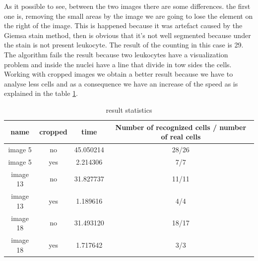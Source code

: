 As it possible to see, between the two images there are some differences. the first one is, removing the small areas by the image we are going to lose the element on the right of the image. This is happened because it was artefact caused by the Giemsa stain method, then is obvious that it's not well segmented because under the stain is not present  leukocyte. The result of the counting in this case is 29. The algorithm fails the result because two leukocytes have a visualization problem and inside the nuclei have a line that divide in tow sides the cells.
Working with cropped images we obtain a better result because we have to analyse less cells and as a consequence we have an increase of the speed as is explained in the table \ref{statistics}.
\begin{table}
\centering
\begin{tabular}{|c|c|c|c|}
\hline 
name & cropped & time & Number of recognized cells / number of real cells\\ 
\hline 
image 5 & no & 45.050214 & 28/26\\ 
\hline 
image 5 & yes & 2.214306 & 7/7\\ 
\hline 
image 13 & no & 31.827737 & 11/11 \\ 
\hline 
image 13 & yes & 1.189616 & 4/4 \\ 
\hline 
image 18 & no & 31.493120 & 18/17\\ 
\hline 
image 18 & yes & 1.717642 & 3/3 \\ 
\hline 
\end{tabular} 
\caption{result statistics}
\label{statistics}
\end{table}